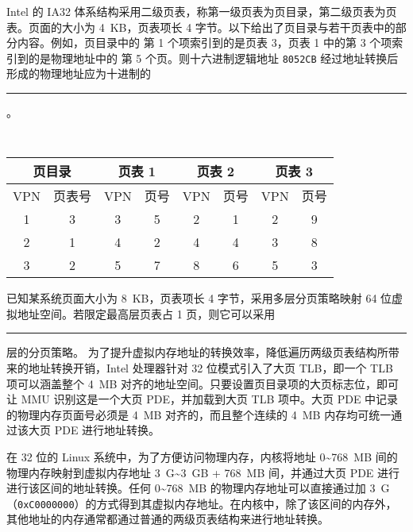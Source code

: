 \begin{problems}
\begin{choices}
        \end{choices}
         Intel 的 IA32 体系结构采用二级页表，称第一级页表为页目录，第二级页表为页表。页面的大小为 \SI{4}{KB}，页表项长 4 字节。以下给出了页目录与若干页表中的部分内容。例如，页目录中的 第 1 个项索引到的是页表 3，页表 1 中的第 3 个项索引到的是物理地址中的 第 5 个页。则十六进制逻辑地址 \verb|8052CB| 经过地址转换后形成的物理地址应为十进制的 \rule{2.5cm}{0.25mm}。
        \begin{table}[H]
            \tt
            \centering
            \begin{tabular}{|cc|cc|cc|cc|}
                \hline
                \multicolumn{2}{|c|}{页目录} & \multicolumn{2}{c|}{页表 1} & \multicolumn{2}{c|}{页表 2} & \multicolumn{2}{c|}{页表 3} \\ \hline
                \multicolumn{1}{|c|}{VPN} & 页表号 & \multicolumn{1}{c|}{VPN} & 页号 & \multicolumn{1}{c|}{VPN} & 页号 & \multicolumn{1}{c|}{VPN} & 页号 \\ \hline
                \multicolumn{1}{|c|}{1} & 3 & \multicolumn{1}{c|}{3} & 5 & \multicolumn{1}{c|}{2} & 1 & \multicolumn{1}{c|}{2} & 9 \\ \hline
                \multicolumn{1}{|c|}{2} & 1 & \multicolumn{1}{c|}{4} & 2 & \multicolumn{1}{c|}{4} & 4 & \multicolumn{1}{c|}{3} & 8 \\ \hline
                \multicolumn{1}{|c|}{3} & 2 & \multicolumn{1}{c|}{5} & 7 & \multicolumn{1}{c|}{8} & 6 & \multicolumn{1}{c|}{5} & 3 \\ \hline
            \end{tabular}
        \end{table}
         已知某系统页面大小为 \SI{8}{KB}，页表项长 4 字节，采用多层分页策略映射 64 位虚拟地址空间。若限定最高层页表占 1 页，则它可以采用\rule{2.5cm}{0.25mm} 层的分页策略。
         为了提升虚拟内存地址的转换效率，降低遍历两级页表结构所带来的地址转换开销，Intel 处理器针对 32 位模式引入了大页 TLB，即一个 TLB 项可以涵盖整个 \SI{4}{MB} 对齐的地址空间。只要设置页目录项的大页标志位，即可让 MMU 识别这是一个大页 PDE，并加载到大页 TLB 项中。大页 PDE 中记录的物理内存页面号必须是 \SI{4}{MB} 对齐的，而且整个连续的 \SI{4}{MB} 内存均可统一通过该大页 PDE 进行地址转换。
        
        在 32 位的 Linux 系统中，为了方便访问物理内存，内核将地址 0\textasciitilde\SI{768}{MB} 间的物理内存映射到虚拟内存地址 \SI{3}{G}\textasciitilde\SI{3}{GB} + \SI{768}{MB} 间，并通过大页 PDE 进行进行该区间的地址转换。任何 0\textasciitilde\SI{768}{MB} 的物理内存地址可以直接通过加 \SI{3}{G}（\verb|0xC0000000|）的方式得到其虚拟内存地址。在内核中，除了该区间的内存外，其他地址的内存通常都通过普通的两级页表结构来进行地址转换。
        

\end{problems}
